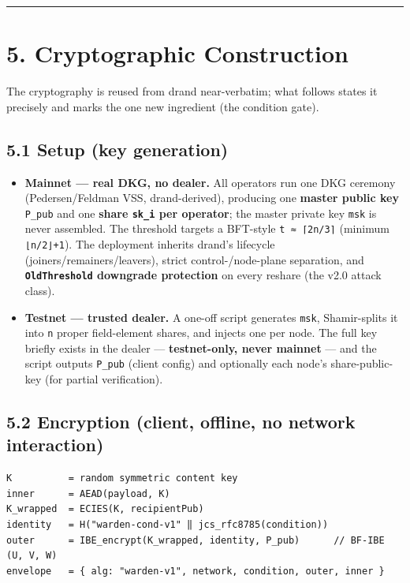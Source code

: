 \documentclass[
  11pt,
]{article}
\providecommand{\tightlist}{%
  \setlength{\itemsep}{0pt}\setlength{\parskip}{0pt}}
\begin{document}
\begin{center}\rule{0.5\linewidth}{0.5pt}\end{center}

\section{5. Cryptographic
Construction}\label{cryptographic-construction}

The cryptography is reused from drand near-verbatim; what follows states
it precisely and marks the one new ingredient (the condition gate).

\subsection{5.1 Setup (key generation)}\label{setup-key-generation}

\begin{itemize}
\tightlist
\item
  \textbf{Mainnet --- real DKG, no dealer.} All operators run one DKG
  ceremony (Pedersen/Feldman VSS, drand-derived), producing one
  \textbf{master public key} \texttt{P\_pub} and one \textbf{share
  \texttt{sk\_i} per operator}; the master private key \texttt{msk} is
  never assembled. The threshold targets a BFT-style
  \texttt{t\ ≈\ ⌈2n/3⌉} (minimum \texttt{⌊n/2⌋+1}). The deployment
  inherits drand's lifecycle (joiners/remainers/leavers), strict
  control-/node-plane separation, and \textbf{\texttt{OldThreshold}
  downgrade protection} on every reshare (the v2.0 attack class).
\item
  \textbf{Testnet --- trusted dealer.} A one-off script generates
  \texttt{msk}, Shamir-splits it into \texttt{n} proper field-element
  shares, and injects one per node. The full key briefly exists in the
  dealer --- \textbf{testnet-only, never mainnet} --- and the script
  outputs \texttt{P\_pub} (client config) and optionally each node's
  share-public-key (for partial verification).
\end{itemize}

\subsection{5.2 Encryption (client, offline, no network
interaction)}\label{encryption-client-offline-no-network-interaction}

\begin{verbatim}
K          = random symmetric content key
inner      = AEAD(payload, K)
K_wrapped  = ECIES(K, recipientPub)
identity   = H("warden-cond-v1" ‖ jcs_rfc8785(condition))
outer      = IBE_encrypt(K_wrapped, identity, P_pub)      // BF-IBE (U, V, W)
envelope   = { alg: "warden-v1", network, condition, outer, inner }
\end{verbatim}
\end{document}
